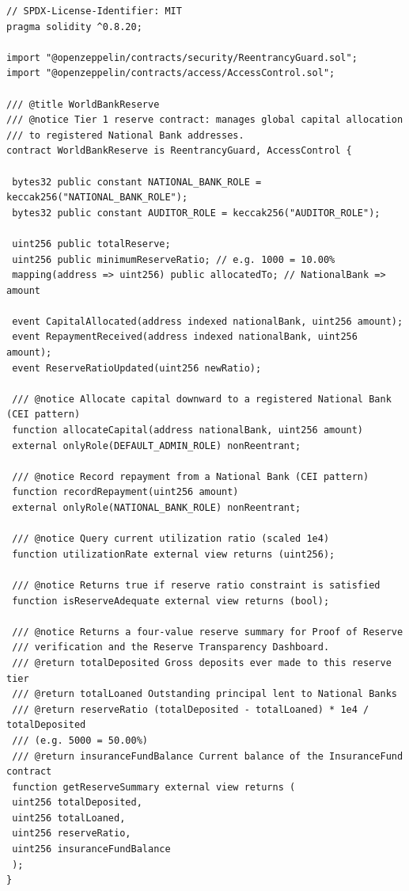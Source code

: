 \documentclass[12pt, a4paper]{report}
\begin{document}
\begin{lstlisting}[language=Solidity,basicstyle=\ttfamily\scriptsize,breaklines=true,
 commentstyle=\color{GrayText},keywordstyle=\color{PrimaryBlue}\bfseries,
 frame=single,rulecolor=\color{AccentBlue!40},captionpos=b,
 caption={WorldBankReserve.sol -- Tier 1 public interface. Full implementation in project repository.}]
// SPDX-License-Identifier: MIT
pragma solidity ^0.8.20;

import "@openzeppelin/contracts/security/ReentrancyGuard.sol";
import "@openzeppelin/contracts/access/AccessControl.sol";

/// @title WorldBankReserve
/// @notice Tier 1 reserve contract: manages global capital allocation
/// to registered National Bank addresses.
contract WorldBankReserve is ReentrancyGuard, AccessControl {

 bytes32 public constant NATIONAL_BANK_ROLE = keccak256("NATIONAL_BANK_ROLE");
 bytes32 public constant AUDITOR_ROLE = keccak256("AUDITOR_ROLE");

 uint256 public totalReserve;
 uint256 public minimumReserveRatio; // e.g. 1000 = 10.00%
 mapping(address => uint256) public allocatedTo; // NationalBank => amount

 event CapitalAllocated(address indexed nationalBank, uint256 amount);
 event RepaymentReceived(address indexed nationalBank, uint256 amount);
 event ReserveRatioUpdated(uint256 newRatio);

 /// @notice Allocate capital downward to a registered National Bank (CEI pattern)
 function allocateCapital(address nationalBank, uint256 amount)
 external onlyRole(DEFAULT_ADMIN_ROLE) nonReentrant;

 /// @notice Record repayment from a National Bank (CEI pattern)
 function recordRepayment(uint256 amount)
 external onlyRole(NATIONAL_BANK_ROLE) nonReentrant;

 /// @notice Query current utilization ratio (scaled 1e4)
 function utilizationRate external view returns (uint256);

 /// @notice Returns true if reserve ratio constraint is satisfied
 function isReserveAdequate external view returns (bool);

 /// @notice Returns a four-value reserve summary for Proof of Reserve
 /// verification and the Reserve Transparency Dashboard.
 /// @return totalDeposited Gross deposits ever made to this reserve tier
 /// @return totalLoaned Outstanding principal lent to National Banks
 /// @return reserveRatio (totalDeposited - totalLoaned) * 1e4 / totalDeposited
 /// (e.g. 5000 = 50.00%)
 /// @return insuranceFundBalance Current balance of the InsuranceFund contract
 function getReserveSummary external view returns (
 uint256 totalDeposited,
 uint256 totalLoaned,
 uint256 reserveRatio,
 uint256 insuranceFundBalance
 );
}
\end{lstlisting}
\end{document}
